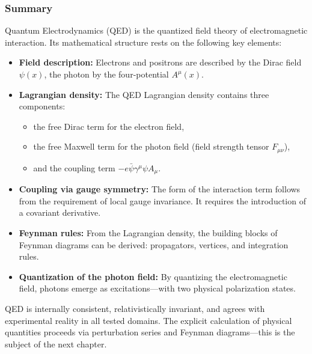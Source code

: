 \subsubsection{Summary}


Quantum Electrodynamics (QED) is the quantized field theory of electromagnetic interaction. Its mathematical structure rests on the following key elements:

\begin{itemize}
	\item \textbf{Field description:} Electrons and positrons are described by the Dirac field $\psi(x)$, the photon by the four-potential $A^\mu(x)$.
	\item \textbf{Lagrangian density:} The QED Lagrangian density contains three components:
	\begin{itemize}
		\item the free Dirac term for the electron field,
		\item the free Maxwell term for the photon field (field strength tensor $F_{\mu\nu}$),
		\item and the coupling term $-e \bar{\psi} \gamma^\mu \psi A_\mu$.
	\end{itemize}
	\item \textbf{Coupling via gauge symmetry:} The form of the interaction term follows from the requirement of local gauge invariance. It requires the introduction of a covariant derivative.
	\item \textbf{Feynman rules:} From the Lagrangian density, the building blocks of Feynman diagrams can be derived: propagators, vertices, and integration rules.
	\item \textbf{Quantization of the photon field:} By quantizing the electromagnetic field, photons emerge as excitations—with two physical polarization states.
\end{itemize}

QED is internally consistent, relativistically invariant, and agrees with experimental reality in all tested domains. The explicit calculation of physical quantities proceeds via perturbation series and Feynman diagrams—this is the subject of the next chapter.

